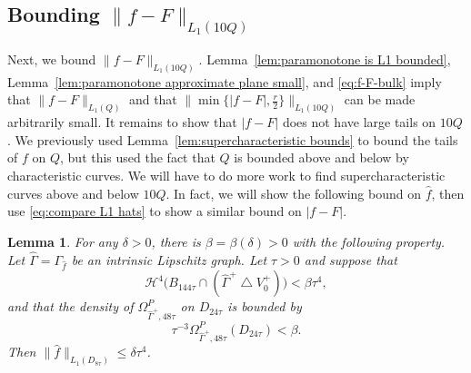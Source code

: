 \documentclass[11pt,reqno]{amsart}
\newcommand{\cH}{\mathcal{H}}
\newcommand{\0}{\mathbf{0}}
\renewcommand{\1}{\mathbf 1}
\newcommand{\symdiff}{\mathbin{\triangle}}
\renewcommand{\le}{\leqslant}
\newtheorem{lemma}[thm]{Lemma}
\theoremstyle{remark}
\begin{document}
\subsection{Bounding $\|f - F\|_{L_1(10Q)}$}
Next, we bound $\|f - F\|_{L_1(10Q)}$.  Lemma~\ref{lem:paramonotone is L1 bounded}, Lemma~\ref{lem:paramonotone approximate plane small}, and \eqref{eq:f-F-bulk} imply that $\|f - F\|_{L_1(Q)}$ and that $\|\min \{|f-F|,\frac{r}{2}\}\|_{L_1(10Q)}$ can be made arbitrarily small. It remains to show that $|f - F|$ does not have large tails on $10Q$. We previously used Lemma~\ref{lem:supercharacteristic bounds} to bound the tails of $f$ on $Q$, but this used the fact that $Q$ is bounded above and below by characteristic curves. We will have to do more work to find supercharacteristic curves above and below $10Q$.
In fact, we will show the following bound on $\hat{f}$, then use \eqref{eq:compare L1 hats} to show a similar bound on $|f-F|$.
\begin{lemma}\label{lem:paramonotone squares L1 close}
  For any $\delta>0$, there is  $\beta=\beta(\delta)>0$ with the following property.  Let $\hat{\Gamma}=\Gamma_{\hat{f}}$ be an intrinsic Lipschitz graph.  Let $\tau>0$ and suppose that
  \begin{equation}\label{eq:paramonotone D1 symdiff condition}
    \cH^4\big(B_{144\tau}\cap (\hat{\Gamma}^+\symdiff V_0^+)\big)<\beta \tau^4,
  \end{equation}
  and that the density of $\Omega^P_{\hat{\Gamma}^+,48\tau}$ on $D_{24\tau}$ is bounded by
  $$\tau^{-3}\Omega^P_{\hat{\Gamma}^+,48\tau}(D_{24\tau})<\beta.$$
  Then $\|\hat{f}\|_{L_1(D_{8\tau})}\le \delta \tau^4$.
\end{lemma}
\end{document}
